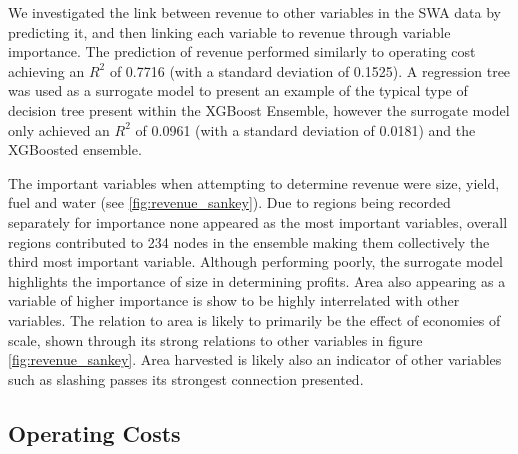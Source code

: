 \documentclass[review,12pt,authoryear]{elsarticle}
\begin{document}
\begin{linenumbers}
We investigated the link between revenue to other variables in the SWA data by predicting it, and then linking each variable to revenue through variable importance. The prediction of revenue performed similarly to operating cost achieving an $R^2$ of 0.7716 (with a standard deviation of 0.1525). A regression tree was used as a surrogate model to present an example of the typical type of decision tree present within the XGBoost Ensemble, however the surrogate model only achieved an $R^2$ of 0.0961 (with a standard deviation of 0.0181) and the XGBoosted ensemble.
\par
The important variables when attempting to determine revenue were size, yield, fuel and water (see \ref{fig:revenue_sankey}). Due to regions being recorded separately for importance none appeared as the most important variables, overall regions contributed to 234 nodes in the ensemble making them collectively the third most important variable. Although performing poorly, the surrogate model highlights the importance of size in determining profits. Area also appearing as a variable of higher importance is show to be highly interrelated with other variables. The relation to area is likely to primarily be the effect of economies of scale, shown through its strong relations to other variables in figure \ref{fig:revenue_sankey}. Area harvested is likely also an indicator of other variables such as slashing passes its strongest connection presented.

\subsection{Operating Costs}


\end{linenumbers}
\end{document}
